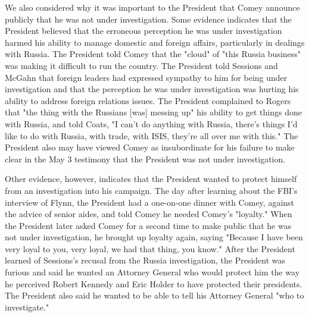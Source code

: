 {We also considered why it was important to the President that Comey announce publicly that he was not under investigation.
Some evidence indicates that the President believed that the erroneous perception he was under investigation harmed his ability to manage domestic and foreign affairs, particularly in dealings with Russia.
The President told Comey that the "cloud" of "this Russia business" was making it difficult to run the country.
The President told Sessions and McGahn that foreign leaders had expressed sympathy to him for being under investigation and that the perception he was under investigation was hurting his ability to address foreign relations issues.
The President complained to Rogers that "the thing with the Russians [was] messing up" his ability to get things done with Russia, and told Coats, "I can't do anything with Russia, there's things I'd
like to do with Russia, with trade, with ISIS, they're all over me with this."
The President also may have viewed Comey as insubordinate for his failure to make clear in the May 3 testimony that the President was not under investigation.

Other evidence, however, indicates that the President wanted to protect himself from an investigation into his campaign.
The day after learning about the FBI's interview of Flynn, the President had a one-on-one dinner with Comey, against the advice of senior aides, and told Comey he needed Comey's "loyalty."
When the President later asked Comey for a second time to make public that he was not under investigation, he brought up loyalty again, saying "Because I have been very loyal to you, very loyal, we had that thing, you know."
After the President learned of Sessions's recusal from the Russia investigation, the President was furious and said he wanted an Attorney General who would protect him the way he perceived Robert Kennedy and Eric Holder to have protected their presidents.
The President also said he wanted to be able to tell his Attorney General "who to investigate."

}
